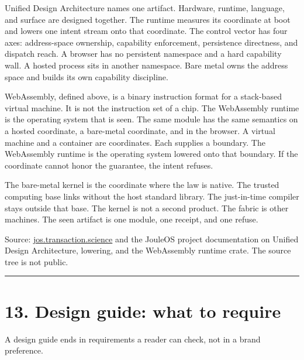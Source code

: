 \documentclass[10pt,letterpaper]{article}
\begin{document}
Unified Design Architecture names one artifact. Hardware, runtime,
language, and surface are designed together. The runtime measures its
coordinate at boot and lowers one intent stream onto that coordinate.
The control vector has four axes: address-space ownership, capability
enforcement, persistence directness, and dispatch reach. A browser has
no persistent namespace and a hard capability wall. A hosted process
sits in another namespace. Bare metal owns the address space and builds
its own capability discipline.

WebAssembly, defined above, is a binary instruction format for a
stack-based virtual machine. It is not the instruction set of a chip.
The WebAssembly runtime is the operating system that is seen. The same
module has the same semantics on a hosted coordinate, a bare-metal
coordinate, and in the browser. A virtual machine and a container are
coordinates. Each supplies a boundary. The WebAssembly runtime is the
operating system lowered onto that boundary. If the coordinate cannot
honor the guarantee, the intent refuses.

The bare-metal kernel is the coordinate where the law is native. The
trusted computing base links without the host standard library. The
just-in-time compiler stays outside that base. The kernel is not a
second product. The fabric is other machines. The seen artifact is one
module, one receipt, and one refuse.

Source: \href{https://jos.transaction.science/}{jos.transaction.science}
and the JouleOS project documentation on Unified Design Architecture,
lowering, and the WebAssembly runtime crate. The source tree is not
public.

\begin{center}\rule{0.5\linewidth}{0.5pt}\end{center}

\section{13. Design guide: what to
require}\label{design-guide-what-to-require}

A design guide ends in requirements a reader can check, not in a brand
preference.
\end{document}
